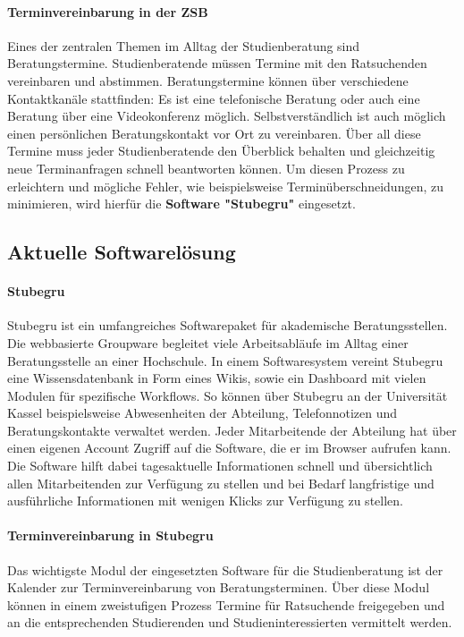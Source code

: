 \paragraph{Terminvereinbarung in der ZSB}
Eines der zentralen Themen im Alltag der Studienberatung sind Beratungstermine.
Studienberatende müssen Termine mit den Ratsuchenden
vereinbaren und abstimmen. Beratungstermine können über verschiedene
Kontaktkanäle stattfinden: Es ist eine telefonische Beratung oder auch eine
Beratung über eine Videokonferenz möglich. Selbstverständlich ist auch möglich
einen persönlichen Beratungskontakt vor Ort zu vereinbaren. Über all diese
Termine muss jeder Studienberatende den Überblick behalten und gleichzeitig
neue Terminanfragen schnell beantworten können. Um diesen Prozess zu
erleichtern und mögliche Fehler, wie beispielsweise Terminüberschneidungen, zu
minimieren, wird hierfür die \textbf{Software "Stubegru"} eingesetzt.

\subsection{Aktuelle Softwarelösung}
\paragraph{Stubegru}
Stubegru ist ein umfangreiches Softwarepaket für akademische Beratungsstellen.
Die webbasierte Groupware begleitet viele Arbeitsabläufe im Alltag einer
Beratungsstelle an einer Hochschule. In einem Softwaresystem vereint Stubegru
eine Wissensdatenbank in Form eines Wikis, sowie ein Dashboard mit vielen
Modulen für spezifische Workflows. So können über Stubegru an der Universität
Kassel beispielsweise Abwesenheiten der Abteilung, Telefonnotizen und
Beratungskontakte verwaltet werden. Jeder Mitarbeitende der Abteilung hat über
einen eigenen Account Zugriff auf die Software, die er im Browser aufrufen
kann. Die Software hilft dabei tagesaktuelle Informationen schnell und
übersichtlich allen Mitarbeitenden zur Verfügung zu stellen und bei Bedarf
langfristige und ausführliche Informationen mit wenigen Klicks zur Verfügung zu
stellen.\cite{stubegruWebsite}

\paragraph{Terminvereinbarung in Stubegru}
Das wichtigste Modul der eingesetzten Software für die Studienberatung ist der
Kalender zur Terminvereinbarung von Beratungsterminen. Über diese Modul können
in einem zweistufigen Prozess Termine für Ratsuchende freigegeben und an die
entsprechenden Studierenden und Studieninteressierten vermittelt werden.

